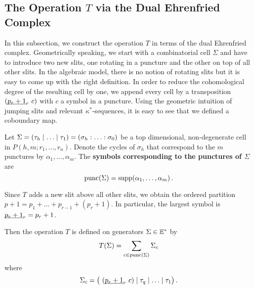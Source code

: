 \subsection{The Operation \texorpdfstring{$T$}{T} via the Dual Ehrenfried Complex}
In this subsection, we construct the operation $T$ in terms of the dual Ehrenfried complex.
Geometrically speaking, we start with a combinatorial cell $\Sigma$ and have to introduce two new slits,
one rotating in a puncture and the other on top of all other slits.
In the algebraic model, there is no notion of rotating slits but it is easy to come up with the right definition.
In order to reduce the cohomological degree of the resulting cell by one, we append every cell by a transposition $(\underline{\smash{p_r+1}}_r\ c)$ with $c$ a symbol in a puncture.
Using the geometric intuition of jumping slits and relevant $\kappa^\ast$-sequences, it is easy to see that we defined a coboundary map.

\begin{defi}
    \label{homology_operations:parallel_T:symbols_of_a_puncture}
    Let $\Sigma = \inhom = \homog$ be a top dimensional, non-degenerate cell in $P(h,m; r_1, \ldots, r_n)$.
    Denote the cycles of $\sigma_h$ that correspond to the $m$ punctures by $\alpha_1, \ldots, \alpha_m$.
    The {\bfseries symbols corresponding to the punctures of $\Sigma$} are
    \[
        \punc(\Sigma) = \supp(\alpha_1, \ldots, \alpha_m) \,.
    \]
\end{defi}
\begin{notation}
    Since $T$ adds a new slit above all other slits, we obtain the ordered partition $p+1 = p_1 + \ldots + p_{r-1} + (p_r+1)$.
    In particular, the largest symbol is $\underline{\smash{p_r+1}}_r = p_r+1$.
\end{notation}

\begin{defi}
    \label{homology_operations:parallel_T:defn_on_cells}
    Then the operation $T$ is defined on generators $\Sigma \in \mathbb E^\ast$ by
    \[
        T(\Sigma) = \sum_{c \in \operatorname{punc}(\Sigma)} \Sigma_c 
    \]
    where
    \[
        \Sigma_c = \big(\ (\ul{p_r+1}_r\ c) \mid \tau_q \mid \ldots \mid \tau_1 \big) \,.
    \]
\end{defi}

